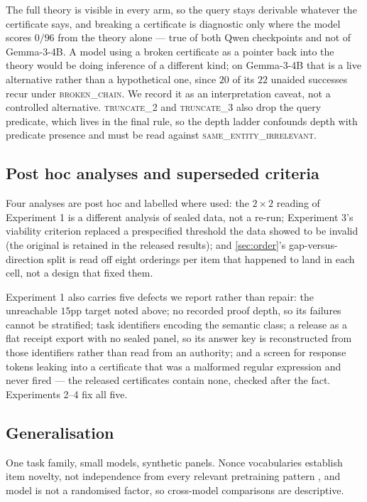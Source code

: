 \documentclass[10pt,twocolumn]{article}
\begin{document}
The full theory is visible in every arm, so the query stays derivable whatever
the certificate says, and breaking a certificate is diagnostic only where the
model scores $0/96$ from the theory alone --- true of both Qwen checkpoints and
not of Gemma-3-4B. A model using a broken
certificate as a pointer back into the theory would be doing inference of a
different kind; on Gemma-3-4B that is a live alternative rather than a
hypothetical one, since $20$ of its $22$ unaided successes recur under
\textsc{broken\_chain}. We record it as an interpretation caveat, not a
controlled alternative. \textsc{truncate\_2} and \textsc{truncate\_3} also drop the query predicate, which
lives in the final rule, so the depth ladder confounds depth with predicate
presence and must be read against \textsc{same\_entity\_irrelevant}.

\subsection{Post hoc analyses and superseded criteria}

Four analyses are post hoc and labelled where used: the $2\times2$ reading of
Experiment 1 is a different analysis of sealed data, not a re-run; Experiment 3's
viability criterion replaced a prespecified threshold the data showed to be
invalid (the original is retained in the released results); and \cref{sec:order}'s gap-versus-direction split is read off eight orderings per
item that happened to land in each cell, not a design that fixed them.

Experiment 1 also carries five defects we report rather than repair: the
unreachable $15$pp target noted above; no recorded proof depth, so its failures
cannot be stratified; task identifiers encoding the semantic class; a release as
a flat receipt export with no sealed panel, so its answer key is reconstructed
from those identifiers rather than read from an authority; and a screen for
response tokens leaking into a certificate that was a malformed regular
expression and never fired --- the released certificates contain none, checked
after the fact. Experiments 2--4 fix all five.

\subsection{Generalisation}

One task family, small models, synthetic panels. Nonce vocabularies establish
item novelty, not independence from every relevant pretraining pattern
\citep{golchin2023time,deng2024investigating}, and model is not a randomised
factor, so cross-model comparisons are descriptive.
\end{document}
